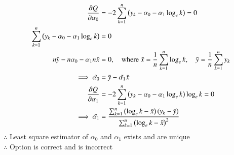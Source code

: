 \documentclass[journal,12pt,onecolumn]{IEEEtran}
\theoremstyle{remark}
\begin{document}
\begin{enumerate}
\begin{align}
\frac{\partial Q}{\partial \alpha_{0}} &= -2 \sum_{k = 1}^{n} \left(y_{k}-\alpha_{0}-\alpha_{1} \log_{e}k\right) = 0\\
	\sum_{k = 1}^{n} \left(y_{k}-\alpha_{0}-\alpha_{1} \log_{e}k\right) &= 0\\
	n\bar{y} - n\alpha_{0} - \alpha_{1}n\bar{x} &= 0 , \quad \text{where } \bar{x} = \frac{1}{n} \sum_{k = 1}^{n}\log_{e}k,\quad \bar{y} = \frac{1}{n} \sum_{k = 1}^{n}y_{k}\\
	\implies \tilde{\alpha_{0}} &= \bar{y} - \tilde{\alpha_{1}}\bar{x}\\
	\frac{\partial Q}{\partial \alpha_{1}} &= -2 \sum_{k = 1}^{n} \left(y_{k}-\alpha_{0}-\alpha_{1} \log_{e}k\right)\log_{e}k = 0\\
	\implies \tilde{\alpha_{1}} &= \frac{\sum_{k = 1}^{n}\left(\log_{e}k-\bar{x}\right)\left(y_{k}-\bar{y}\right)}{\sum_{k = 1}^{n}\left(\log_{e}k-\bar{x}\right)^2}
\end{align}
$\therefore$ Least square estimator of $\alpha_{0}$ and $\alpha_{1}$ exists and are unique\\
$\therefore$ Option  is correct and  is incorrect\\
\end{enumerate}
\end{document}

